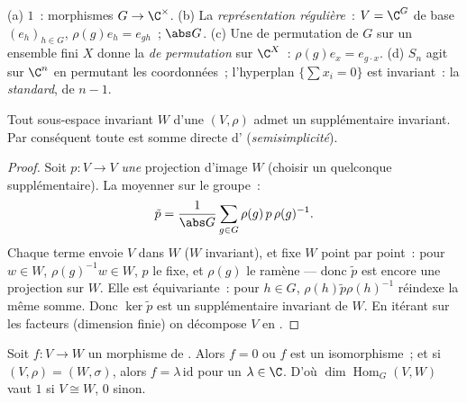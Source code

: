 \begin{example}\label{ex:b3:representations:examples}
(a)  $1$~: morphismes $G \to \C^\times$.
(b) La \emph{représentation régulière}~: $V = \C^G$ de base $(e_h)_{h \in G}$,
$\rho(g)e_h = e_{gh}$~;  $\abs G$.
(c) Une  de permutation de $G$ sur un ensemble fini $X$
donne la \emph{ de permutation} sur $\C^X$~:
$\rho(g)e_x = e_{g\cdot x}$.
(d) $S_n$ agit sur $\C^n$ en permutant les coordonnées~;
l'hyperplan $\{\sum x_i = 0\}$ est invariant~: la
\emph{ standard}, de  $n - 1$.
\end{example}

\begin{theorem}[Maschke]\label{thm:b3:representations:maschke}
Tout sous-espace invariant $W$ d'une  $(V, \rho)$
admet un supplémentaire invariant. Par conséquent toute
 est somme directe d'
(\emph{semisimplicité}).
\end{theorem}

\begin{proof}
Soit $p \colon V \to V$ \emph{une} projection d'image $W$
(choisir un quelconque supplémentaire). La moyenner sur le
groupe~:
\[
\tilde p = \frac1{\abs G}\sum_{g \in G} \rho(g)\,p\,\rho(g)^{-1}.
\]
Chaque terme envoie $V$ dans $W$ ($W$ invariant), et fixe $W$
point par point~: pour $w \in W$, $\rho(g)^{-1}w \in W$, $p$ le
fixe, et $\rho(g)$ le ramène --- donc $\tilde p$ est encore une
projection sur $W$. Elle est équivariante~: pour $h \in G$,
$\rho(h)\tilde p\rho(h)^{-1}$ réindexe la même somme. Donc $\ker
\tilde p$ est un supplémentaire invariant de $W$. En itérant sur
les facteurs (dimension finie) on décompose $V$ en .
\end{proof}

\begin{theorem}\label{thm:b3:representations:schur}
Soit $f \colon V \to W$ un morphisme de 
\emph{}. Alors $f = 0$ ou $f$ est un isomorphisme~;
et si $(V,\rho) = (W,\sigma)$, alors $f = \lambda\,\mathrm{id}$
pour un $\lambda \in \C$. D'où $\dim\operatorname{Hom}_G(V, W)$
vaut $1$ si $V \cong W$, $0$ sinon.
\end{theorem}

